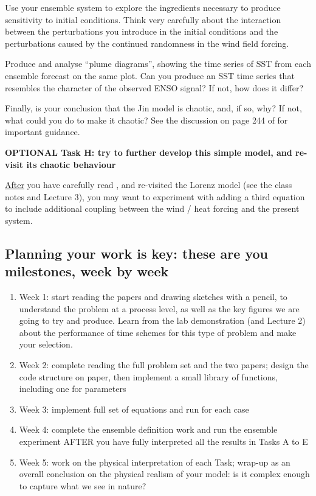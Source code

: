 \documentclass[11pt,a4paper]{article}
\begin{document}
Use your ensemble system to explore the ingredients necessary to
produce sensitivity to initial conditions. Think very carefully about the interaction between the perturbations you introduce in the initial conditions and the perturbations caused by the continued randomness in the wind field forcing.

Produce and analyse ``plume diagrams'', showing the time series of SST from each
ensemble forecast on the same plot. Can
you produce an SST time series that resembles the character of the
observed ENSO signal? If not, how does it differ? 

Finally, is your conclusion that the Jin model is chaotic, and, if so, why? If not, what could you do to make it chaotic? See the discussion on page 244 of \cite{Vallis:86} for important guidance.

{\large\bf OPTIONAL Task H: try to further develop this simple model, and re-visit its chaotic behaviour}

 \underline{After} you have carefully read  \cite{Vallis:86}, and re-visited the Lorenz model (see the class notes and Lecture 3), you may want to experiment with adding a third equation to include additional coupling between the wind / heat forcing and the present system.

\pagebreak
\subsection*{Planning your work is key: these are you milestones, week by week}
\begin{enumerate}
	\item Week 1: start reading the papers and drawing sketches with a pencil, to understand the problem at a process level, as well as the key figures we are going to try and produce. Learn from the lab demonstration (and Lecture 2) about the performance of time schemes for this type of problem and make your selection.
	\item Week 2: complete reading the full problem set and the two papers; design the code structure on paper, then implement a small library of functions, including one for parameters
	\item Week 3: implement full set of equations and run for each case
	\item Week 4: complete the ensemble definition work and run the ensemble experiment AFTER you have fully interpreted all the results in Tasks A to E
	\item Week 5: work on the physical interpretation of each Task; wrap-up as an overall conclusion on the physical realism of your model: is it complex enough to capture what we see in nature?
\end{enumerate}
\end{document}

